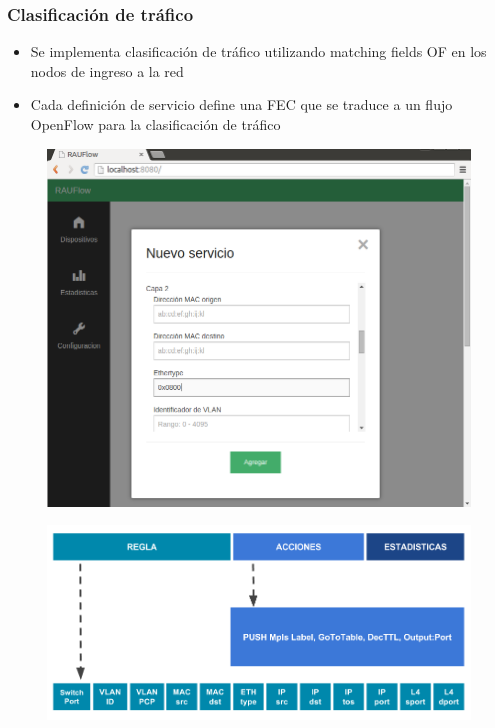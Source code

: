 \documentclass{beamer}
\begin{document}
\begin{frame}
\frametitle{Clasificaci\'on de tr\'afico} 

\begin{itemize}
\item Se implementa clasificaci\'on de tr\'afico utilizando matching fields OF en los nodos de ingreso a la red
\item Cada definici\'on de servicio define una FEC que se traduce a un flujo OpenFlow para la clasificaci\'on de tr\'afico
\end{itemize}

\vspace{0.3cm}

\begin{minipage}{0.40\textwidth}

\begin{figure}[htp]
\includegraphics[width=1.0\textwidth]{imagenes/rauflowsnap.png}
\end{figure}

\end{minipage}
\hfill
\begin{minipage}{0.59\textwidth}
\centering
\begin{figure}[htp]
\includegraphics[width=1.0\textwidth]{imagenes/clasificaciontra.png}
\end{figure}

\end{minipage}



\end{frame}
\end{document}
